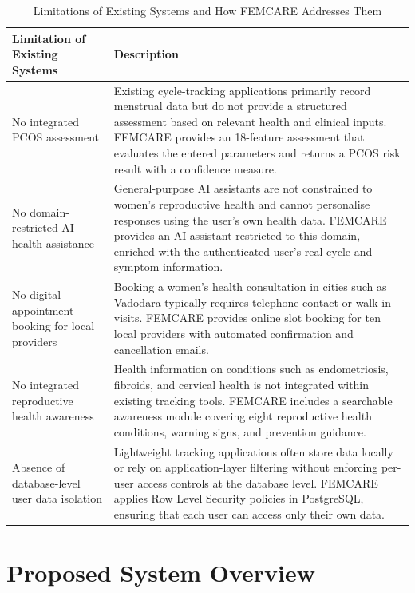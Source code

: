 \begin{table}[h!]
\centering
\caption{Limitations of Existing Systems and How FEMCARE Addresses Them}
\label{tab:existing-limitations}
\renewcommand{\arraystretch}{1.4}
\begin{tabular}{|p{4.2cm}|p{8.1cm}|}
\hline
\rowcolor[HTML]{D9D9D9}
\textbf{Limitation of Existing Systems} & \textbf{Description} \\
\hline
No integrated PCOS assessment &
Existing cycle-tracking applications primarily record menstrual data but do not provide a structured assessment based on relevant health and clinical inputs. FEMCARE provides an 18-feature assessment that evaluates the entered parameters and returns a PCOS risk result with a confidence measure. \\
\hline
No domain-restricted AI health assistance &
General-purpose AI assistants are not constrained to women's reproductive health and cannot personalise responses using the user's own health data. FEMCARE provides an AI assistant restricted to this domain, enriched with the authenticated user's real cycle and symptom information. \\
\hline
No digital appointment booking for local providers &
Booking a women's health consultation in cities such as Vadodara typically requires telephone contact or walk-in visits. FEMCARE provides online slot booking for ten local providers with automated confirmation and cancellation emails. \\
\hline
No integrated reproductive health awareness &
Health information on conditions such as endometriosis, fibroids, and cervical health is not integrated within existing tracking tools. FEMCARE includes a searchable awareness module covering eight reproductive health conditions, warning signs, and prevention guidance. \\
\hline
Absence of database-level user data isolation &
Lightweight tracking applications often store data locally or rely on application-layer filtering without enforcing per-user access controls at the database level. FEMCARE applies Row Level Security policies in PostgreSQL, ensuring that each user can access only their own data. \\
\hline
\end{tabular}
\end{table}

\section{Proposed System Overview}
\label{sec:proposed}

